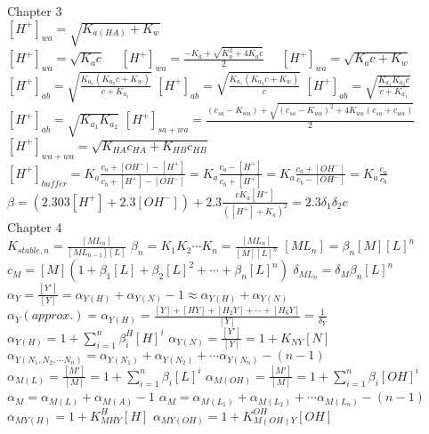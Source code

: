 \documentclass[10pt,twocolumn]{article}
\begin{document}
    \noindent
    \tiny Chapter 3\\
    \([H^+]_{wa} = \sqrt{K_{a(HA)}+K_w}\)
    \\ \([H^+]_{wa} = \sqrt{K_ac} \quad\)
    \([H^+]_{wa} = \frac{-K_a+\sqrt{K_a^2+4K_ac}}{2} \quad\)
    \([H^+]_{wa} = \sqrt{K_ac+K_w}\)
    \\ \([H^+]_{ab} = \sqrt{\frac{K_{a_1}(K_{a_2}c+K_w)}{c+K_{a_1}}}\)
    \([H^+]_{ab} = \sqrt{\frac{K_{a_1}(K_{a_2}c+K_w)}{c}}\)
    \([H^+]_{ab} =\sqrt{\frac{K_{a_1}K_{a_2}c}{c+K_{a_1}}}\)
    \\\([H^+]_{ab} = \sqrt{K_{a_1}K_{a_2}}\)
    \([H^+]_{sa+wa}=\frac{(c_{sa}-K_{wa})+\sqrt{(c_{sa}-K_{wa})^2+4K_{wa}(c_{sa}+c_{wa})}}{2}\)
    \\ \([H^+]_{wa+wa}=\sqrt{K_{HA}c_{HA}+K_{HB}c_{HB}}\)
    \\ \([H^+]_{buffer}=K_a\frac{c_a+[{OH}^-]-[H^+]}{c_b+[H^+]-[{OH}^-]}=K_a\frac{c_a-[H^+]}{c_b+[H^+]}=K_a\frac{c_a+[{OH}^-]}{c_b-[{OH}^-]}=K_a\frac{c_a}{c_b}\)
    \\ \(\beta = (2.303[H^+]+2.3[{OH}^-])+2.3\frac{cK_a[H^+]}{([H^+]+K_a)^2} = 2.3 \delta_1 \delta_2 c\) \\
    Chapter 4 \\
    \(K_{stable,n}=\frac{[ML_n]}{[ML_{n-1}][L]}\) \quad
    \(\beta_n = K_1K_2\cdots K_n = \frac{[ML_n]}{[M][L]^n}\) \quad
    \([ML_n]=\beta_n[M][L]^n\) \\
    \(c_M=[M](1+\beta_1[L]+\beta_2[L]^2+\cdots+\beta_n[L]^n)\) \quad
    \(\delta_{ML_n}=\delta_{M}\beta_{n}[L]^n\) \\
    \(\alpha_Y = \frac{[Y']}{[Y]} = \alpha_{Y(H)} + \alpha_{Y(N)} - 1 \approx \alpha_{Y(H)} + \alpha_{Y(N)}\)\\
    \(\alpha_Y(approx.)=\alpha_{Y(H)}=\frac{[Y]+[HY]+[H_2Y]+\cdots+[H_6Y]}{[Y]}=\frac{1}{\delta_{Y}}\) \quad
    \(\alpha_{Y(H)}=1+\sum\limits_{i=1}^n \beta_i^H[H]^i\)
    \(\alpha_{Y(N)}=\frac{[Y']}{[Y]}=1+K_{NY}[N]\) \quad
    \(\alpha_{Y(N_1,N_2,\cdots N_n)}=\alpha_{Y(N_1)}+\alpha_{Y(N_2)}+\cdots \alpha_{Y(N_n)}- (n-1)\) \\
    \(\alpha_{M(L)}=\frac{[M']}{[M]}=1+\sum\limits_{i=1}^n \beta_i [L]^i\) \quad
    \(\alpha_{M(OH)}=\frac{[M']}{[M]}=1+\sum\limits_{i=1}^n \beta_i [OH]^i\)\\
    \(\alpha_M = \alpha_{M(L)} + \alpha_{M(A)} - 1\) \quad
    \(\alpha_{M}=\alpha_{M(L_1)}+\alpha_{M(L_2)}+\cdots \alpha_{M(L_n)}- (n-1)\) \\
    \(\alpha_{MY(H)} = 1 + K^H_{MHY}[H]\) \quad
    \(\alpha_{MY(OH)} = 1 + K^{OH}_{M(OH)Y}[OH]\) \\
\end{document}
